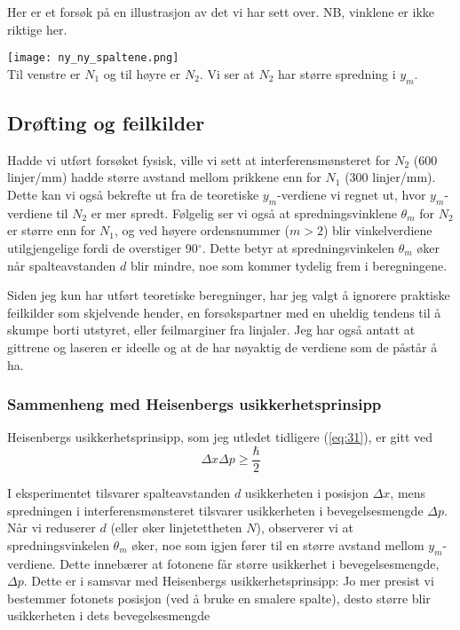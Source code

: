 \documentclass{article}
\begin{document}
\vspace{0.2in}
Her er et forsøk på en illustrasjon av det vi har sett over. NB, vinklene er ikke riktige her.
\vspace{0.1in}
\begin{center}
\texttt{[image: ny\_ny\_spaltene.png]} \\
\caption{\label{fig:Spaltene} Til venstre er $N_1$ og til høyre er $N_2$. Vi ser at $N_2$ har større spredning i $y_m$.}
\end{center}

\vspace{0.2in}


\subsection{Drøfting og feilkilder}
Hadde vi utført forsøket fysisk, ville vi sett at interferensmønsteret for $N_2$ (600 linjer/mm) hadde større avstand mellom prikkene enn for $N_1$ (300 linjer/mm). Dette kan vi også bekrefte ut fra de teoretiske $y_m$-verdiene vi regnet ut, hvor $y_m$-verdiene til $N_2$ er mer spredt. Følgelig ser vi også at spredningsvinklene $\theta_m$ for $N_2$ er større enn for $N_1$, og ved høyere ordensnummer ($m > 2$) blir vinkelverdiene utilgjengelige fordi de overstiger 90$^\circ$. Dette betyr at spredningsvinkelen $\theta_m$ øker når spalteavstanden $d$ blir mindre, noe som kommer tydelig frem i beregningene. 

Siden jeg kun har utført teoretiske beregninger, har jeg valgt å ignorere praktiske feilkilder som skjelvende hender, en forsøkspartner med en uheldig tendens til å skumpe borti utstyret, eller feilmarginer fra linjaler. Jeg har også antatt at gittrene og laseren er ideelle og at de har nøyaktig de verdiene som de påstår å ha.


\vspace{0.15in}

\subsubsection{Sammenheng med Heisenbergs usikkerhetsprinsipp}
Heisenbergs usikkerhetsprinsipp, som jeg utledet tidligere (\ref{eq:31}), er gitt ved 
\begin{equation*}
    \Delta x \Delta p \ge \frac{\hbar}{2}
\end{equation*}

I eksperimentet tilsvarer spalteavstanden $d$ usikkerheten i posisjon $\Delta x$, mens spredningen i interferensmønsteret tilsvarer usikkerheten i bevegelsesmengde $\Delta p$. Når vi reduserer $d$ (eller øker linjetettheten $N$), observerer vi at spredningsvinkelen $\theta_m$ øker, noe som igjen fører til en større avstand mellom $y_m$-verdiene. Dette innebærer at fotonene får større usikkerhet i bevegelsesmengde, $\Delta p$. Dette er i samsvar med Heisenbergs usikkerhetsprinsipp: Jo mer presist vi bestemmer fotonets posisjon (ved å bruke en smalere spalte), desto større blir usikkerheten i dets bevegelsesmengde
\end{document}
